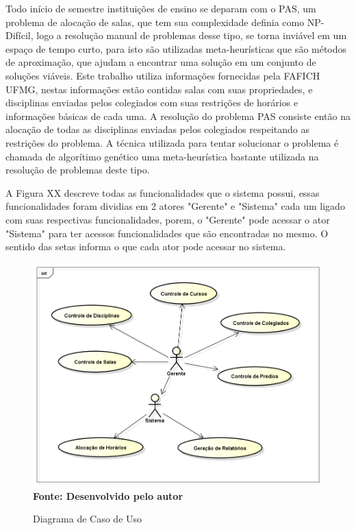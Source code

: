 
\iniciocapitulo
Todo início de semestre instituições de ensino se deparam com o PAS, um problema de alocação de salas, que tem sua complexidade definia como NP-Difícil, logo a resolução manual de problemas desse tipo, se torna inviável em um espaço de tempo curto, para isto são utilizadas meta-heurísticas que são métodos de aproximação, que ajudam a encontrar uma solução em um conjunto de soluções viáveis. Este trabalho utiliza informações fornecidas pela FAFICH UFMG, nestas informações estão contidas salas com suas propriedades, e disciplinas enviadas pelos colegiados com suas restrições de horários e informações básicas de cada uma. A resolução do problema PAS consiste então na alocação de todas as disciplinas enviadas pelos colegiados respeitando as restrições do problema. A técnica utilizada para tentar solucionar o problema é chamada de algorítimo genético uma meta-heurística bastante utilizada na resolução de problemas deste tipo.\par



A Figura XX descreve todas as funcionalidades que o sistema possui, essas funcionalidades foram dividias em 2 atores "Gerente" e "Sistema" cada um ligado com suas respectivas funcionalidades, porem, o "Gerente" pode acessar o ator "Sistema" para ter acessos funcionalidades que são encontradas no mesmo. O sentido das setas informa o que cada ator pode acessar no sistema.\par

\begin{figure}[!htb]
\caption[Diagrama de Caso de Uso]{Diagrama de Caso de Uso}
\label{fig:figura1}
\centering
\includegraphics[scale=0.5]{imagens/diagramaCasoUso.png}
\\ \textbf{\footnotesize Fonte: Desenvolvido pelo autor}
\end{figure}

